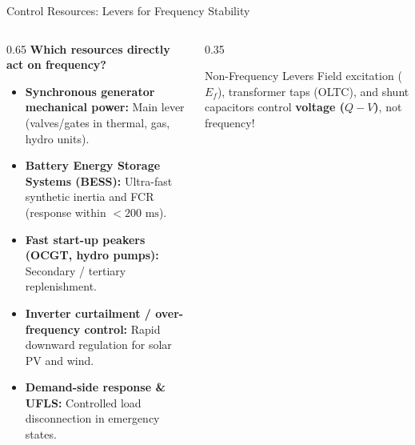 \begin{frame}{Control Resources: Levers for Frequency Stability}
\begin{columns}[T]
\begin{column}{0.65\textwidth}
    \textbf{Which resources directly act on frequency?}
    \begin{itemize}\setlength{\itemsep}{2pt}
        \item \alert{\textbf{Synchronous generator mechanical power:}} Main lever (valves/gates in thermal, gas, hydro units).
        \item \alert{\textbf{Battery Energy Storage Systems (BESS):}} Ultra-fast synthetic inertia and FCR (response within $< 200\text{ ms}$).
        \item \alert{\textbf{Fast start-up peakers (OCGT, hydro pumps):}} Secondary / tertiary replenishment.
        \item \alert{\textbf{Inverter curtailment / over-frequency control:}} Rapid downward regulation for solar PV and wind.
        \item \alert{\textbf{Demand-side response \& UFLS:}} Controlled load disconnection in emergency states.
    \end{itemize}
\end{column}
\begin{column}{0.35\textwidth}
    \begin{block}{Non-Frequency Levers}
    \scriptsize
    Field excitation ($E_f$), transformer taps (OLTC), and shunt capacitors control \textbf{voltage ($Q-V$)}, not frequency!
    \end{block}
\end{column}
\end{columns}
\end{frame}


